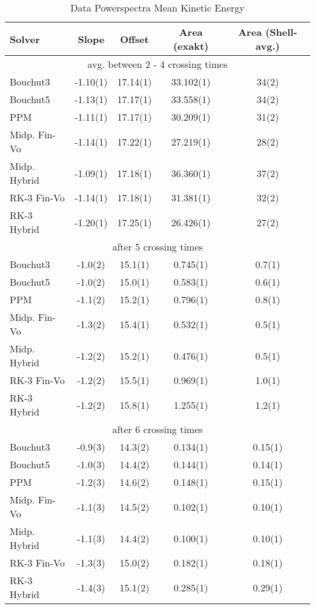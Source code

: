 \begin{table}[H]
\fontsize{3mm}{3mm}\selectfont
\captionsetup{width=.8\textwidth}
\caption{Data Powerspectra Mean Kinetic Energy}
\centering
\begin{tabular}{lcccc}
\toprule
Solver & Slope & Offset & Area (exakt) & Area (Shell-avg.) \\
\midrule
\multicolumn{5}{c}{avg. between 2 - 4 crossing times} \\
\midrule
Bouchut3 	     & -1.10(1) & 17.14(1) & 33.102(1) & 34(2) \\
Bouchut5 	     & -1.13(1) & 17.17(1) & 33.558(1) & 34(2) \\
PPM 	         & -1.11(1) & 17.17(1) & 30.209(1) & 31(2) \\
Midp. Fin-Vo 	 & -1.14(1) & 17.22(1) & 27.219(1) & 28(2) \\
Midp. Hybrid 	 & -1.09(1) & 17.18(1) & 36.360(1) & 37(2) \\
RK-3  Fin-Vo 	 & -1.14(1) & 17.18(1) & 31.381(1) & 32(2) \\
RK-3  Hybrid 	 & -1.20(1) & 17.25(1) & 26.426(1) & 27(2) \\
\midrule
\multicolumn{5}{c}{after 5 crossing times} \\
\midrule
Bouchut3 	    &  -1.0(2) & 15.1(1) & 0.745(1) & 0.7(1) \\
Bouchut5 	    &  -1.0(2) & 15.0(1) & 0.583(1) & 0.6(1) \\
PPM 	        &  -1.1(2) & 15.2(1) & 0.796(1) & 0.8(1) \\
Midp. Fin-Vo 	&  -1.3(2) & 15.4(1) & 0.532(1) & 0.5(1) \\
Midp. Hybrid 	&  -1.2(2) & 15.2(1) & 0.476(1) & 0.5(1) \\
RK-3  Fin-Vo 	&  -1.2(2) & 15.5(1) & 0.969(1) & 1.0(1) \\
RK-3  Hybrid 	&  -1.2(2) & 15.8(1) & 1.255(1) & 1.2(1) \\
\midrule
\multicolumn{5}{c}{after 6 crossing times} \\
\midrule
Bouchut3 	    & -0.9(3) & 14.3(2) & 0.134(1) & 0.15(1) \\
Bouchut5 	    & -1.0(3) & 14.4(2) & 0.144(1) & 0.14(1) \\
PPM 	        & -1.2(3) & 14.6(2) & 0.148(1) & 0.15(1) \\
Midp. Fin-Vo 	& -1.1(3) & 14.5(2) & 0.102(1) & 0.10(1) \\
Midp. Hybrid 	& -1.1(3) & 14.4(2) & 0.100(1) & 0.10(1) \\
RK-3  Fin-Vo 	& -1.3(3) & 15.0(2) & 0.182(1) & 0.18(1) \\
RK-3  Hybrid 	& -1.4(3) & 15.1(2) & 0.285(1) & 0.29(1) \\
\bottomrule
\end{tabular}
\label{tab:pws-ekin}
\end{table}


